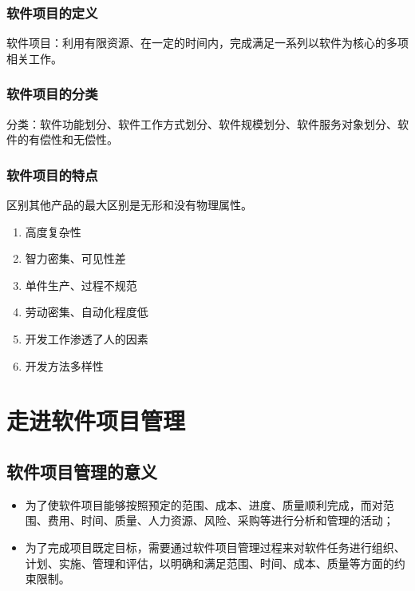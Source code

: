\subsubsection*{软件项目的定义}
软件项目：利用有限资源、在一定的时间内，完成满足一系列以软件为核心的多项相关工作。
\subsubsection*{软件项目的分类}
分类：软件功能划分、软件工作方式划分、软件规模划分、软件服务对象划分、软件的有偿性和无偿性。
\subsubsection*{软件项目的特点}
区别其他产品的最大区别是无形和没有物理属性。
\begin{enumerate}
	\item 高度复杂性
	\item 智力密集、可见性差
	\item 单件生产、过程不规范
	\item 劳动密集、自动化程度低
	\item 开发工作渗透了人的因素
	\item 开发方法多样性
\end{enumerate}
\section{走进软件项目管理}
\subsection{软件项目管理的意义}
\begin{itemize}
	\item 为了使软件项目能够按照预定的范围、成本、进度、质量顺利完成，而对范围、费用、时间、质量、人力资源、风险、采购等进行分析和管理的活动；
	\item 为了完成项目既定目标，需要通过软件项目管理过程来对软件任务进行组织、计划、实施、管理和评估，以明确和满足范围、时间、成本、质量等方面的约束限制。
\end{itemize}
